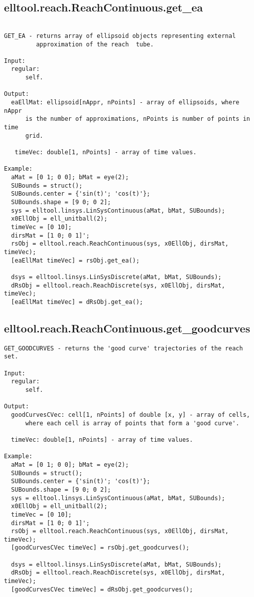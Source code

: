 \subsection{\texorpdfstring{elltool.reach.ReachContinuous.get\_ea}{get\_ea}}\label{method:elltool.reach.ReachContinuous.getea}
\begin{verbatim}

GET_EA - returns array of ellipsoid objects representing external
         approximation of the reach  tube.

Input:
  regular:
      self.

Output:
  eaEllMat: ellipsoid[nAppr, nPoints] - array of ellipsoids, where nAppr
      is the number of approximations, nPoints is number of points in time
      grid.

   timeVec: double[1, nPoints] - array of time values.

Example:
  aMat = [0 1; 0 0]; bMat = eye(2);
  SUBounds = struct();
  SUBounds.center = {'sin(t)'; 'cos(t)'};
  SUBounds.shape = [9 0; 0 2];
  sys = elltool.linsys.LinSysContinuous(aMat, bMat, SUBounds);
  x0EllObj = ell_unitball(2);
  timeVec = [0 10];
  dirsMat = [1 0; 0 1]';
  rsObj = elltool.reach.ReachContinuous(sys, x0EllObj, dirsMat, timeVec);
  [eaEllMat timeVec] = rsObj.get_ea();

  dsys = elltool.linsys.LinSysDiscrete(aMat, bMat, SUBounds);
  dRsObj = elltool.reach.ReachDiscrete(sys, x0EllObj, dirsMat, timeVec);
  [eaEllMat timeVec] = dRsObj.get_ea();
\end{verbatim}
\subsection{\texorpdfstring{elltool.reach.ReachContinuous.get\_goodcurves}{get\_goodcurves}}\label{method:elltool.reach.ReachContinuous.getgoodcurves}
\begin{verbatim}
GET_GOODCURVES - returns the 'good curve' trajectories of the reach set.

Input:
  regular:
      self.

Output:
  goodCurvesCVec: cell[1, nPoints] of double [x, y] - array of cells,
      where each cell is array of points that form a 'good curve'.

  timeVec: double[1, nPoints] - array of time values.

Example:
  aMat = [0 1; 0 0]; bMat = eye(2);
  SUBounds = struct();
  SUBounds.center = {'sin(t)'; 'cos(t)'};
  SUBounds.shape = [9 0; 0 2];
  sys = elltool.linsys.LinSysContinuous(aMat, bMat, SUBounds);
  x0EllObj = ell_unitball(2);
  timeVec = [0 10];
  dirsMat = [1 0; 0 1]';
  rsObj = elltool.reach.ReachContinuous(sys, x0EllObj, dirsMat, timeVec);
  [goodCurvesCVec timeVec] = rsObj.get_goodcurves();

  dsys = elltool.linsys.LinSysDiscrete(aMat, bMat, SUBounds);
  dRsObj = elltool.reach.ReachDiscrete(sys, x0EllObj, dirsMat, timeVec);
  [goodCurvesCVec timeVec] = dRsObj.get_goodcurves();
\end{verbatim}
